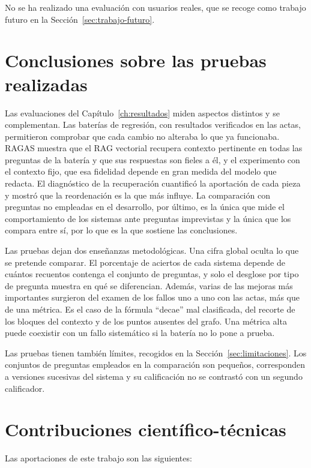 \documentclass[11pt, a4paper]{report}
\begin{document}
	No se ha realizado una evaluación con usuarios reales, que se recoge como
	trabajo futuro en la Sección~\ref{sec:trabajo-futuro}.

	\section{Conclusiones sobre las pruebas realizadas}

	Las evaluaciones del Capítulo~\ref{ch:resultados} miden aspectos distintos y
	se complementan. Las baterías de regresión, con resultados verificados en las
	actas, permitieron comprobar que cada cambio no alteraba lo que ya funcionaba.
	RAGAS muestra que el RAG vectorial recupera contexto pertinente en todas las
	preguntas de la batería y que sus respuestas son fieles a él, y el experimento
	con el contexto fijo, que esa fidelidad depende en gran medida del modelo que redacta. El diagnóstico de la recuperación cuantificó la aportación de cada
	pieza y mostró que la reordenación es la que más influye. La comparación con preguntas no empleadas en el
	desarrollo, por último, es la única que mide el comportamiento de los sistemas
	ante preguntas imprevistas y la única que los compara entre sí, por lo que es
	la que sostiene las conclusiones.

	Las pruebas dejan dos enseñanzas metodológicas. Una cifra global oculta lo que se pretende comparar. El porcentaje de aciertos de cada
	sistema depende de cuántos recuentos contenga el conjunto de preguntas, y solo
	el desglose por tipo de pregunta muestra en qué se diferencian. Además, varias de las mejoras más importantes surgieron del examen de los fallos
	uno a uno con las actas, más que de una métrica. Es el caso de la fórmula
	``decae'' mal clasificada, del recorte de los bloques del contexto y de los
	puntos ausentes del grafo. Una métrica alta puede coexistir con un fallo
	sistemático si la batería no lo pone a prueba.

	Las pruebas tienen también límites, recogidos en la
	Sección~\ref{sec:limitaciones}. Los conjuntos de preguntas empleados en la
	comparación son pequeños, corresponden a versiones sucesivas del sistema y su
	calificación no se contrastó con un segundo calificador.

	\section{Contribuciones científico-técnicas}

	Las aportaciones de este trabajo son las siguientes:
\end{document}
